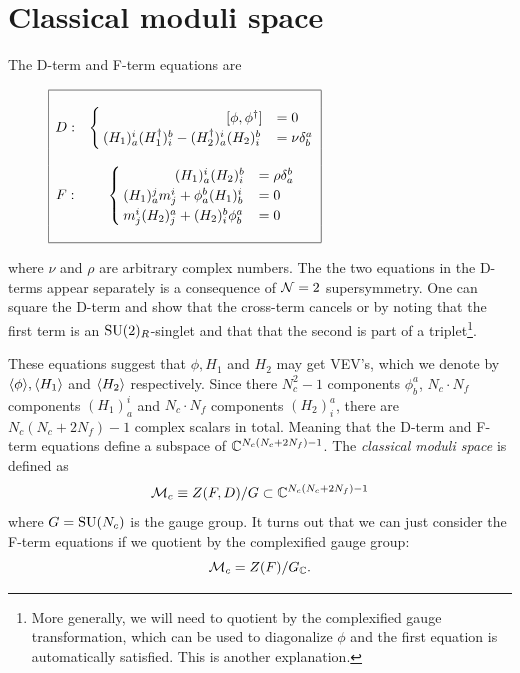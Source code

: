 \section{Classical moduli space}

    The D-term and F-term equations are
    \begin{figure}[H]
        \centering
        $
        \begin{array}{|cc|}
            \hline
            & \\
            D:& \begin{cases}
                \hspace{3.1cm}[\phi,\phi^\dagger]  &= 0 \\
                (H_1)^i_a(H^\dagger_1)^b_i-(H^\dagger_2)^i_a(H_2)^b_i &= \nu\delta^a_b
            \end{cases}\\
        & \\
        F:&
        \begin{cases}
            \hspace{1.3cm}(H_1)^i_a(H_2)^b_i &= \rho\delta^b_a \\
            (H_1)^j_am^i_j+\phi^b_a(H_1)^i_b &= 0 \\
            m^i_j(H_2)^a_j+(H_2)^b_i\phi^a_b &= 0
        \end{cases}\\
        & \\ \hline
        \end{array}
        $
    \end{figure}
    where $\nu$ and $\rho$ are arbitrary complex numbers. The the two equations in the D-terms appear separately is a consequence of $\mathcal{N}=2$ supersymmetry. One can square the D-term and show that the cross-term cancels or by noting that the first term is an $\text{SU}(2)_R$-singlet and that that the second is part of a triplet\footnote{More generally, we will need to quotient by the complexified gauge transformation, which can be used to diagonalize $\phi$ and the first equation is automatically satisfied. This is another explanation.}.
    
    These equations suggest that $\phi,H_1$ and $H_2$ may get VEV's, which we denote by $\langle\phi\rangle,\langle H_1\rangle$ and $\langle H_2\rangle$ respectively. Since there $N^2_c-1$ components $\phi^a_b$, $N_c\cdot N_f$ components $(H_1)^i_a$ and $N_c\cdot N_f$ components $(H_2)^a_i$, there are $N_c(N_c+2N_f)-1$ complex scalars in total. Meaning that the D-term and F-term equations define a subspace of $\mathbb{C}^{N_c(N_c+2N_f)-1}$. The \emph{classical moduli space} is defined as
    \begin{equation}
        \mathcal{M}_c\equiv Z(F,D)/G\subset \mathbb{C}^{N_c(N_c+2N_f)-1}
    \end{equation}
    where $G=\text{SU}(N_c)$ is the gauge group. It turns out that we can just consider the F-term equations if we quotient by the complexified gauge group:
    \begin{equation}
        \mathcal{M}_c = Z(F)/G_{\mathbb{C}}.
    \end{equation}

